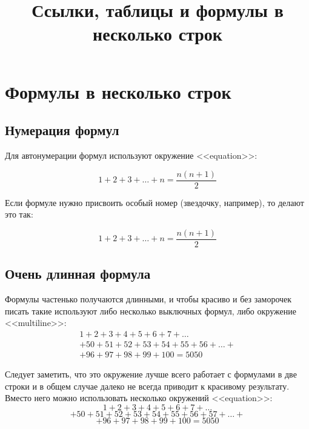 \documentclass[a4paper,12pt]{article} %
\author{}
\title{Ссылки, таблицы и формулы в несколько строк}
\begin{document}

\maketitle


\section{Формулы в несколько строк}


\subsection{Нумерация формул}

Для автонумерации формул используют окружение <<equation>>:

\begin{equation}
	1 + 2 + 3 + \dots + n = \dfrac{n(n+1)}{2}
\end{equation}

Если формуле нужно присвоить особый номер (звездочку, например), то делают это так:

\begin{equation}
	1 + 2 + 3 + \dots + n = \dfrac{n(n+1)}{2} \tag{$\star$}
\end{equation}

\subsection{Очень длинная формула}

Формулы частенько получаются длинными, и чтобы красиво и без заморочек писать такие используют либо несколько выключных формул, либо окружение <<multiline>>:
\begin{multline}
	1+2+3+4+5+6+7+\dots \\
	+50+51+52+53+54+55+56+\dots+ \\ 
	+96+97+98+99+100=5050
\end{multline}

Следует заметить, что это окружение лучше всего работает с формулами в две строки и в общем случае далеко не всегда приводит к красивому результату. Вместо него можно использовать несколько окружений <<equation>>:
\begin{equation*}
	1+2+3+4+5+6+7+\dots
\end{equation*}
\begin{equation*}
	+50+51+52+53+54+55+56+57+\dots+
\end{equation*}
\begin{equation*}
	+96+97+98+99+100=5050
\end{equation*}
\end{document}
